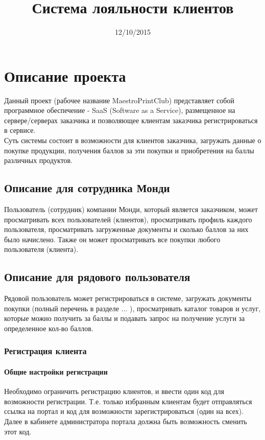 \documentclass[DIV=calc, paper=a4, fontsize=11pt]{scrartcl} %
\title{Система лояльности клиентов}
\date{12/10/2015}
\newcommand{\workingTitle}{MaestroPrintClub}
\newcommand{\clientName}{Монди}
\begin{document}
\tableofcontents

\maketitle

\section{Описание проекта}

Данный проект (рабочее название \workingTitle) представляет собой программное обеспечение - SaaS (Software as a Service), размещенное на сервере/серверах заказчика и позволяющее клиентам заказчика регистрироваться в сервисе. \\[0.5cm]
Суть системы состоит в возможности для клиентов заказчика, загружать данные о покупке продукции, получения баллов за эти покупки и приобретения на баллы различных продуктов.

\subsection{Описание для сотрудника \clientName}
Пользователь (сотрудник) компании \clientName, который является заказчиком, может просматривать всех пользователей (клиентов), просматривать профиль каждого пользователя, просматривать загруженные документы и сколько баллов за них было начислено. Также он может просматривать все покупки любого пользователя (клиента).

\subsection{Описание для рядового пользователя}
Рядовой пользователь может регистрироваться в системе, загружать документы покупки (полный перечень в разделе ... ), просматривать каталог товаров и услуг, которые можно получить за баллы и подавать запрос на получение услуги за определенное кол-во баллов.

\subsubsection{Регистрация клиента}

\paragraph{Общие настройки регистрации}
Необходимо ограничить регистрацию клиентов, и ввести один код для возможности регистрации. Т.е. только избранным клиентам будет отправляться ссылка на портал и код для возможности зарегистрироваться (один на всех). Далее в кабинете администратора портала должна быть возможность сменить этот код.
\end{document}

